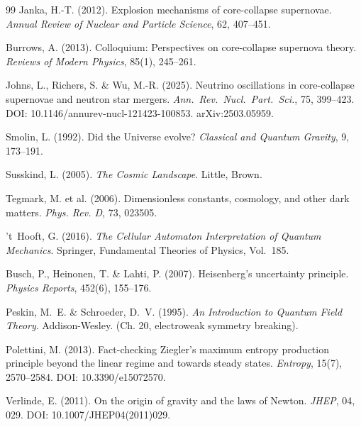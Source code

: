 \documentclass[12pt,a4paper]{article}
\theoremstyle{remark}
\begin{document}
{\begin{thebibliography}{99}
Janka, H.-T. (2012).
\newblock Explosion mechanisms of core-collapse supernovae.
\newblock \textit{Annual Review of Nuclear and Particle Science}, 62, 407--451.

Burrows, A. (2013).
\newblock Colloquium: Perspectives on core-collapse supernova theory.
\newblock \textit{Reviews of Modern Physics}, 85(1), 245--261.

Johns, L., Richers, S. \& Wu, M.-R. (2025).
\newblock Neutrino oscillations in core-collapse supernovae and neutron star mergers.
\newblock \textit{Ann.\ Rev.\ Nucl.\ Part.\ Sci.}, 75, 399--423.
\newblock DOI: 10.1146/annurev-nucl-121423-100853. arXiv:2503.05959.

Smolin, L. (1992).
\newblock Did the Universe evolve?
\newblock \textit{Classical and Quantum Gravity}, 9, 173--191.

Susskind, L. (2005).
\newblock \textit{The Cosmic Landscape}.
\newblock Little, Brown.

Tegmark, M. et al. (2006).
\newblock Dimensionless constants, cosmology, and other dark matters.
\newblock \textit{Phys. Rev. D}, 73, 023505.

't~Hooft, G. (2016).
\newblock \textit{The Cellular Automaton Interpretation of Quantum Mechanics}.
\newblock Springer, Fundamental Theories of Physics, Vol.~185.

Busch, P., Heinonen, T. \& Lahti, P. (2007).
\newblock Heisenberg's uncertainty principle.
\newblock \textit{Physics Reports}, 452(6), 155--176.

Peskin, M.~E. \& Schroeder, D.~V. (1995).
\newblock \textit{An Introduction to Quantum Field Theory}.
\newblock Addison-Wesley. (Ch. 20, electroweak symmetry breaking).

Polettini, M. (2013).
\newblock Fact-checking Ziegler's maximum entropy production principle beyond the linear regime and towards steady states.
\newblock \textit{Entropy}, 15(7), 2570--2584.
\newblock DOI: 10.3390/e15072570.

Verlinde, E. (2011).
\newblock On the origin of gravity and the laws of Newton.
\newblock \textit{JHEP}, 04, 029.
\newblock DOI: 10.1007/JHEP04(2011)029.


\end{thebibliography}}
\end{document}
